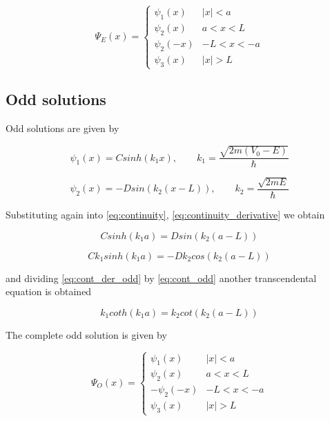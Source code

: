 \documentclass{article}
\begin{document}
\begin{equation}
\Psi_{E}(x) = 
  \begin{cases} 
      \psi_{1}(x) & \left|x\right| < a \\
      \psi_{2}(x) & a < x < L \\
      \psi_{2}(-x) & -L < x < -a \\
      \psi_{3}(x) & \left|x\right| > L
   \end{cases}
\end{equation}

\subsection{Odd solutions}
Odd solutions are given by

\begin{equation}
\psi_{1}(x) = C sinh(k_{1} x), \qquad k_{1} = \frac{\sqrt{2m(V_{0} - E)}}{\hbar}
\end{equation}

\begin{equation}
\psi_{2}(x) = - D sin(k_{2}(x-L)), \qquad k_{2} = \frac{\sqrt{2mE}}{\hbar}
\end{equation}

Substituting again into \eqref{eq:continuity}, \eqref{eq:continuity_derivative} we obtain

\begin{equation}
\label{eq:cont_odd}
C sinh(k_{1}a) =  D sin(k_{2}(a-L))
\end{equation}

\begin{equation}
\label{eq:cont_der_odd}
C k_{1} sinh(k_{1}a) =  - D k_{2} cos(k_{2}(a-L))
\end{equation}

and dividing \eqref{eq:cont_der_odd} by \eqref{eq:cont_odd} another transcendental equation is obtained

\begin{equation}
\label{eq:trans_odd}
k_{1} coth(k_{1}a) = k_{2} cot(k_{2}(a-L))
\end{equation}

The complete odd solution is given by

\begin{equation}
\Psi_{O}(x) = 
  \begin{cases} 
      \psi_{1}(x) & \left|x\right| < a \\
      \psi_{2}(x) & a < x < L \\
      -\psi_{2}(-x) & -L < x < -a \\
      \psi_{3}(x) & \left|x\right| > L
   \end{cases}
\end{equation}
\end{document}

